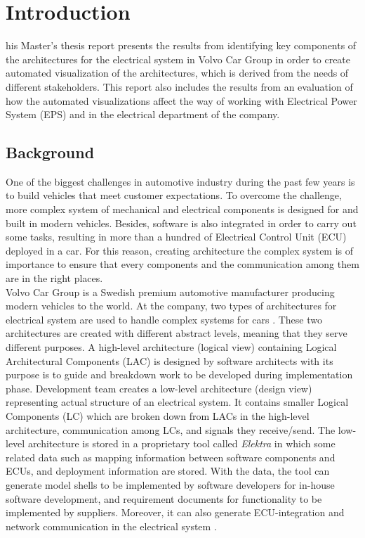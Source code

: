 \chapter{Introduction}
\lettrine[findent=2pt]{}{ }his Master's thesis report presents the results from identifying key components of the architectures for the electrical system in Volvo Car Group in order to create automated visualization of the architectures, which is derived from the needs of different stakeholders. This report also includes the results from an evaluation of how the automated visualizations affect the way of working with Electrical Power System (EPS) and in the electrical department of the company.

\section{Background}\label{Background_ref}
One of the biggest challenges in automotive industry during the past few years is to build vehicles that meet customer expectations. To overcome the challenge, more complex system of mechanical and electrical components is designed for and built in modern vehicles. Besides, software is also integrated in order to carry out some tasks, resulting in more than a hundred of Electrical Control Unit (ECU) deployed in a car. For this reason, creating architecture the complex system is of importance to ensure that every components and the communication among them are in the right places. \\

Volvo Car Group is a Swedish premium automotive manufacturer producing modern vehicles to the world. At the company, two types of architectures for electrical system are used to handle complex systems for cars \cite{Eliasson_1}. These two architectures are created with different abstract levels, meaning that they serve different purposes. A high-level architecture (logical view) containing Logical Architectural Components (LAC) is designed by software architects with its purpose is to guide and breakdown work to be developed during implementation phase. Development team creates a low-level architecture (design view) representing actual structure of an electrical system. It contains smaller Logical Components (LC) which are broken down from LACs in the high-level architecture, communication among LCs, and signals they receive/send. The low-level architecture is stored in a proprietary tool called \textit{Elektra} in which some related data such as mapping information between software components and ECUs, and deployment information are stored. With the data, the tool can generate model shells to be implemented by software developers for in-house software development, and requirement documents for functionality to be implemented by suppliers. Moreover, it can also generate ECU-integration and network communication in the electrical system \cite{Eliasson_2}.\\

